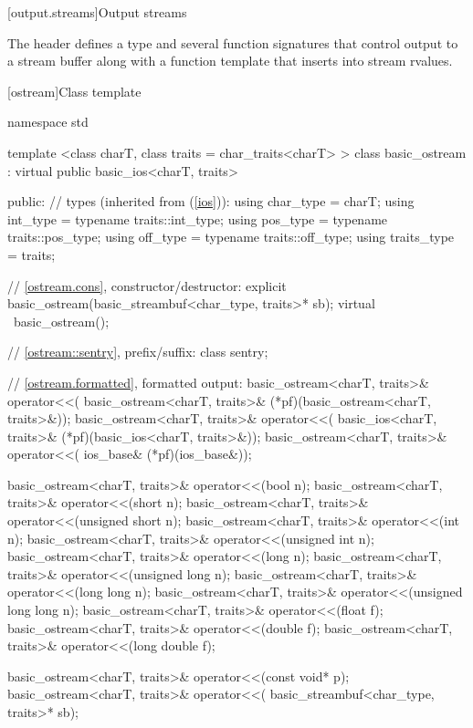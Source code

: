 [output.streams]{Output streams}

\pnum
The header
defines a type
and several function signatures that control output to a
stream buffer along with a function template that inserts into stream rvalues.

[ostream]{Class template }

%
\begin{codeblock}
namespace std {
  template <class charT, class traits = char_traits<charT> >
  class basic_ostream
    : virtual public basic_ios<charT, traits> {
  public:
    // types (inherited from  (\ref{ios})):
    using char_type   = charT;
    using int_type    = typename traits::int_type;
    using pos_type    = typename traits::pos_type;
    using off_type    = typename traits::off_type;
    using traits_type = traits;

    // \ref{ostream.cons}, constructor/destructor:
    explicit basic_ostream(basic_streambuf<char_type, traits>* sb);
    virtual ~basic_ostream();

    // \ref{ostream::sentry}, prefix/suffix:
    class sentry;

    // \ref{ostream.formatted}, formatted output:
    basic_ostream<charT, traits>& operator<<(
      basic_ostream<charT, traits>& (*pf)(basic_ostream<charT, traits>&));
    basic_ostream<charT, traits>& operator<<(
      basic_ios<charT, traits>& (*pf)(basic_ios<charT, traits>&));
    basic_ostream<charT, traits>& operator<<(
      ios_base& (*pf)(ios_base&));

    basic_ostream<charT, traits>& operator<<(bool n);
    basic_ostream<charT, traits>& operator<<(short n);
    basic_ostream<charT, traits>& operator<<(unsigned short n);
    basic_ostream<charT, traits>& operator<<(int n);
    basic_ostream<charT, traits>& operator<<(unsigned int n);
    basic_ostream<charT, traits>& operator<<(long n);
    basic_ostream<charT, traits>& operator<<(unsigned long n);
    basic_ostream<charT, traits>& operator<<(long long n);
    basic_ostream<charT, traits>& operator<<(unsigned long long n);
    basic_ostream<charT, traits>& operator<<(float f);
    basic_ostream<charT, traits>& operator<<(double f);
    basic_ostream<charT, traits>& operator<<(long double f);

    basic_ostream<charT, traits>& operator<<(const void* p);
    basic_ostream<charT, traits>& operator<<(
      basic_streambuf<char_type, traits>* sb);

}}
\end{codeblock}

